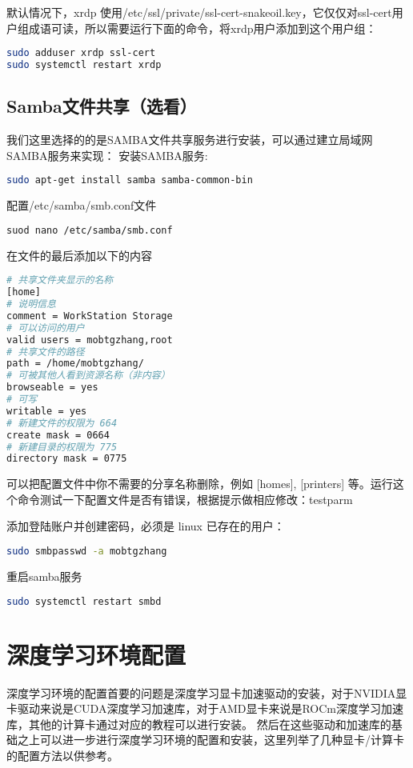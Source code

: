\documentclass[lang=cn,a4paper,newtx]{elegantpaper}
\begin{document}
默认情况下，xrdp 使用/etc/ssl/private/ssl-cert-snakeoil.key，它仅仅对ssl-cert用户组成语可读，所以需要运行下面的命令，将xrdp用户添加到这个用户组：
\begin{lstlisting}[language=bash]
sudo adduser xrdp ssl-cert  
sudo systemctl restart xrdp
\end{lstlisting}

\subsection{Samba文件共享（选看）}
我们这里选择的的是SAMBA文件共享服务进行安装，可以通过建立局域网SAMBA服务来实现：
安装SAMBA服务:
\begin{lstlisting}[language=bash]
sudo apt-get install samba samba-common-bin
\end{lstlisting}

配置/etc/samba/smb.conf文件
\begin{lstlisting}[language=bash]
suod nano /etc/samba/smb.conf
\end{lstlisting}

在文件的最后添加以下的内容
\begin{lstlisting}[language=bash]
# 共享文件夹显示的名称
[home]
# 说明信息
comment = WorkStation Storage
# 可以访问的用户
valid users = mobtgzhang,root
# 共享文件的路径
path = /home/mobtgzhang/
# 可被其他人看到资源名称（非内容）
browseable = yes
# 可写
writable = yes
# 新建文件的权限为 664
create mask = 0664
# 新建目录的权限为 775
directory mask = 0775
\end{lstlisting}

可以把配置文件中你不需要的分享名称删除，例如 [homes], [printers] 等。运行这个命令测试一下配置文件是否有错误，根据提示做相应修改：testparm

添加登陆账户并创建密码，必须是 linux 已存在的用户：
\begin{lstlisting}[language=bash]
sudo smbpasswd -a mobtgzhang
\end{lstlisting}

重启samba服务
\begin{lstlisting}[language=bash]
sudo systemctl restart smbd
\end{lstlisting}

\section{深度学习环境配置}

深度学习环境的配置首要的问题是深度学习显卡加速驱动的安装，对于NVIDIA显卡驱动来说是CUDA深度学习加速库，对于AMD显卡来说是ROCm深度学习加速库，其他的计算卡通过对应的教程可以进行安装。
然后在这些驱动和加速库的基础之上可以进一步进行深度学习环境的配置和安装，这里列举了几种显卡/计算卡的配置方法以供参考。
\end{document}
